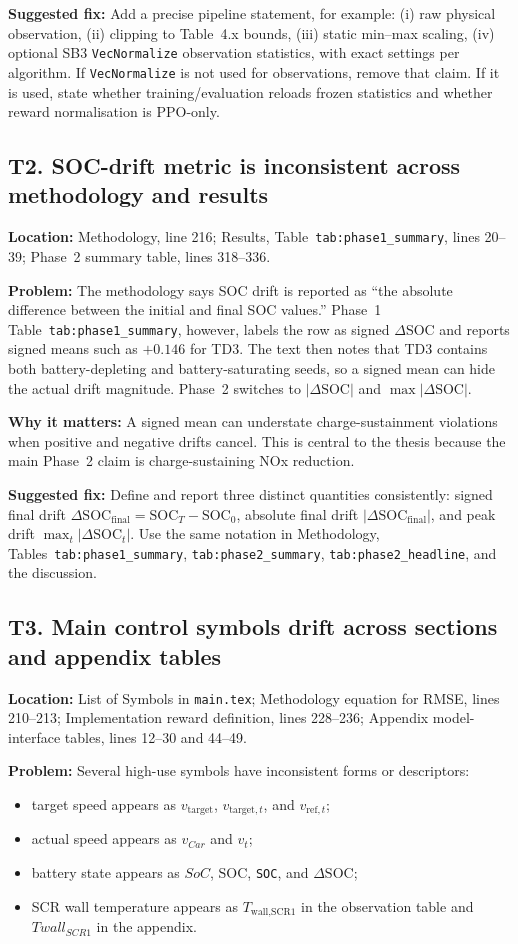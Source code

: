 \documentclass[11pt,a4paper]{article}
\newcommand{\loc}[1]{\textbf{Location:} #1\par}
\newcommand{\problem}{\textbf{Problem:} }
\newcommand{\why}{\textbf{Why it matters:} }
\newcommand{\fix}{\textbf{Suggested fix:} }
\begin{document}
\fix Add a precise pipeline statement, for example: (i) raw physical observation, (ii) clipping to Table~4.x bounds, (iii) static min--max scaling, (iv) optional SB3 \texttt{VecNormalize} observation statistics, with exact settings per algorithm. If \texttt{VecNormalize} is not used for observations, remove that claim. If it is used, state whether training/evaluation reloads frozen statistics and whether reward normalisation is PPO-only.

\subsection*{T2. SOC-drift metric is inconsistent across methodology and results}

\loc{Methodology, line 216; Results, Table~\texttt{tab:phase1\_summary}, lines 20--39; Phase~2 summary table, lines 318--336.}
\problem The methodology says SOC drift is reported as ``the absolute difference between the initial and final SOC values.'' Phase~1 Table~\texttt{tab:phase1\_summary}, however, labels the row as signed $\Delta$SOC and reports signed means such as $+0.146$ for TD3. The text then notes that TD3 contains both battery-depleting and battery-saturating seeds, so a signed mean can hide the actual drift magnitude. Phase~2 switches to $|\Delta\mathrm{SOC}|$ and $\max|\Delta\mathrm{SOC}|$.

\why A signed mean can understate charge-sustainment violations when positive and negative drifts cancel. This is central to the thesis because the main Phase~2 claim is charge-sustaining NOx reduction.

\fix Define and report three distinct quantities consistently: signed final drift $\Delta\mathrm{SOC}_{\mathrm{final}}=\mathrm{SOC}_{T}-\mathrm{SOC}_0$, absolute final drift $|\Delta\mathrm{SOC}_{\mathrm{final}}|$, and peak drift $\max_t|\Delta\mathrm{SOC}_t|$. Use the same notation in Methodology, Tables~\texttt{tab:phase1\_summary}, \texttt{tab:phase2\_summary}, \texttt{tab:phase2\_headline}, and the discussion.

\subsection*{T3. Main control symbols drift across sections and appendix tables}

\loc{List of Symbols in \texttt{main.tex}; Methodology equation for RMSE, lines 210--213; Implementation reward definition, lines 228--236; Appendix model-interface tables, lines 12--30 and 44--49.}
\problem Several high-use symbols have inconsistent forms or descriptors:
\begin{itemize}
  \item target speed appears as $v_{\mathrm{target}}$, $v_{\mathrm{target},t}$, and $v_{\text{ref},t}$;
  \item actual speed appears as $v_{Car}$ and $v_t$;
  \item battery state appears as $SoC$, $\mathrm{SOC}$, \texttt{SOC}, and $\Delta\text{SOC}$;
  \item SCR wall temperature appears as $T_{\text{wall,SCR1}}$ in the observation table and $Twall_{SCR1}$ in the appendix.
\end{itemize}
\end{document}
